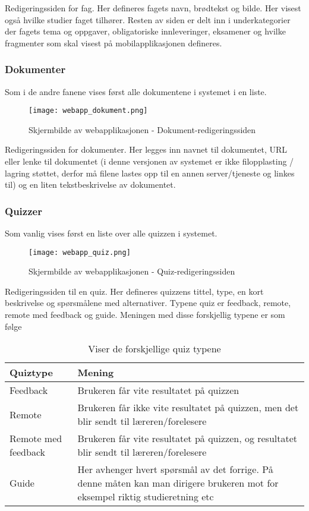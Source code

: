 \documentclass[../main.tex]{subfiles}
\begin{document}
Redigeringssiden for fag. Her defineres fagets navn, brødtekst og bilde. Her visest også hvilke studier faget tilhører. Resten av siden er delt inn i underkategorier der fagets tema og oppgaver, obligatoriske innleveringer, eksamener og hvilke fragmenter som skal visest på mobilapplikasjonen defineres.

\subsubsection{Dokumenter}
Som i de andre fanene vises først alle dokumentene i systemet i en liste.

\begin{figure}[H]
  \centering
  \texttt{[image: webapp\_dokument.png]}
  \caption{Skjermbilde av webapplikasjonen - Dokument-redigeringssiden}
\end{figure}

Redigeringssiden for dokumenter. Her legges inn navnet til dokumentet, URL eller lenke til dokumentet (i denne versjonen av systemet er ikke filopplasting / lagring støttet, derfor må filene lastes opp til en annen server/tjeneste og linkes til) og en liten tekstbeskrivelse av dokumentet.

\subsubsection{Quizzer}

Som vanlig vises først en liste over alle quizzen i systemet.

\begin{figure}[H]
  \centering
  \texttt{[image: webapp\_quiz.png]}
  \caption{Skjermbilde av webapplikasjonen - Quiz-redigeringssiden}
\end{figure}

Redigeringssiden til en quiz. Her defineres quizzens tittel, type, en kort beskrivelse og spørsmålene med alternativer. Typene quiz er feedback, remote, remote med feedback og guide. Meningen med disse forskjellig typene er som følge

\begin{table}[H]
\begin{center}
\caption{Viser de forskjellige quiz typene}
  \begin{tabular}{ | p{5cm} | p{8cm} |}
    \hline
    Quiztype & Mening \\ \hline
    Feedback & Brukeren får vite resultatet på quizzen \\ \hline
    Remote & Brukeren får ikke vite resultatet på quizzen, men det blir sendt til læreren/forelesere \\ \hline
    Remote med feedback & Brukeren får vite resultatet på quizzen, og resultatet blir sendt til læreren/forelesere \\ \hline
    Guide & Her avhenger hvert spørsmål av det forrige. På denne måten kan man dirigere brukeren mot for eksempel riktig studieretning etc \\
    \hline
  \end{tabular}
\end{center}
\end{table}
\end{document}
